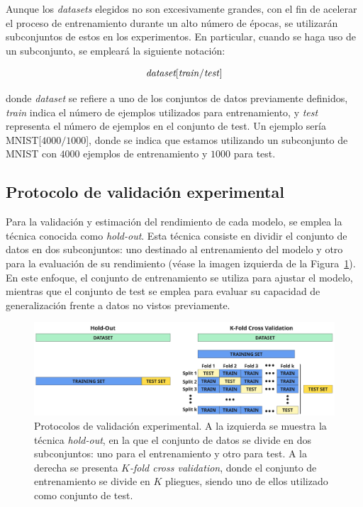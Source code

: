Aunque los \textit{datasets} elegidos no son excesivamente grandes, con el fin de acelerar el proceso de entrenamiento durante un alto número de épocas, se utilizarán subconjuntos de estos en los experimentos. En particular, cuando se haga uso de un subconjunto, se empleará la siguiente notación:

\[
    \textit{dataset}[\text{\textit{train}/\textit{test}}]
\]

donde \textit{dataset} se refiere a uno de los conjuntos de datos previamente definidos, \textit{train} indica el número de ejemplos utilizados para entrenamiento, y \textit{test} representa el número de ejemplos en el conjunto de test. Un ejemplo sería MNIST[$4000/1000$], donde se indica que estamos utilizando un subconjunto de MNIST con $4000$ ejemplos de entrenamiento y $1000$ para test.

\subsection{Protocolo de validación experimental}\label{subsec:protocolo-experimental}

Para la validación y estimación del rendimiento de cada modelo, se emplea la técnica conocida como \textit{hold-out}. Esta técnica consiste en dividir el conjunto de datos en dos subconjuntos: uno destinado al entrenamiento del modelo y otro para la evaluación de su rendimiento (véase la imagen izquierda de la Figura~\ref{fig:protocolos}). En este enfoque, el conjunto de entrenamiento se utiliza para ajustar el modelo, mientras que el conjunto de test se emplea para evaluar su capacidad de generalización frente a datos no vistos previamente. 

\begin{figure}[h]
    \centering
    \includegraphics[width=0.8\linewidth]{img/protocolo-experimental.png}
    \caption[Protocolos de validación experimental.]{Protocolos de validación experimental. A la izquierda se muestra la técnica \textit{hold-out}, en la que el conjunto de datos se divide en dos subconjuntos: uno para el entrenamiento y otro para test. A la derecha se presenta \textit{$K$-fold cross validation}, donde el conjunto de entrenamiento se divide en $K$ pliegues, siendo uno de ellos utilizado como conjunto de test.}\label{fig:protocolos}
\end{figure}

